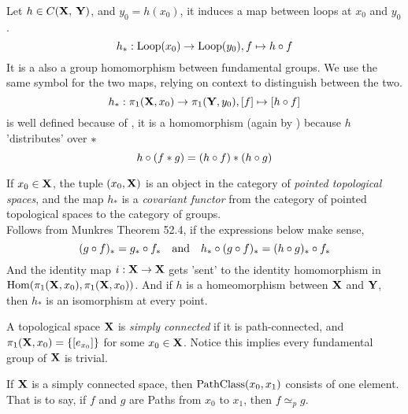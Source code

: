 \documentclass[../main-manifolds.tex]{subfiles}
\providecommand{\phtp}{\simeq_p} %
\providecommand{\fgroup}[2]{\pi_{1}({#1},{#2})}
\begin{document}
\begin{definition}\label{munkres:homomorphism-induced-by-continuous-map}
    Let $h\in C({\mathbf{X}},\: {\mathbf{Y}})$, and $y_0 = h(x_0)$, it induces a map between loops at $x_0$ and $y_0$. 
    \[
        h_*:\Loop[x_0]\to\Loop[y_0], f\mapsto h\circ f
    \]
    It is a also a group homomorphism between fundamental groups. We use the same symbol for the two maps, relying on context to distinguish between the two.
    \[
        h_*:\fgroup{\xx}{x_0}\to\fgroup{\yy}{y_0},[f]\mapsto [h\circ f]
    \]
    is well defined because of , it is a homomorphism (again by ) because $h$ 'distributes' over $\ast$
    \[
        h\circ (f\ast g)=(h\circ f)\ast (h\circ g)
    \]
\end{definition}
\begin{remark}
    If $x_0\in{\mathbf{X}}$, the tuple $(x_0, {\mathbf{X}})$ is an object in the category of \emph{pointed topological spaces}, and the map $h_*$ is a \emph{covariant functor} from the category of pointed topological spaces to the category of groups.\\

    Follows from Munkres Theorem 52.4, if the expressions below make sense,
    \[
        (g\circ f)_* = g_*\circ f_*\qqtext{and}  h_*\circ (g\circ f)_* = (h\circ g)_*\circ f_*
    \]
    And the identity map $i:{\mathbf{X}}\to{\mathbf{X}}$ gets 'sent' to the identity homomorphism in $\Hom[\fgroup{\xx}{x_0},\fgroup{\xx}{x_0}]$. And if $h$ is a homeomorphism between ${\mathbf{X}}$ and ${\mathbf{Y}}$, then $h_*$ is an isomorphism at every point.
\end{remark}


\begin{definition}\label{munkres:simply-connected}
    A topological space ${\mathbf{X}}$ is \emph{simply connected} if it is path-connected, and $\fgroup{\xx}{x_0}=\{[e_{x_0}]\}$ for some $x_0\in {\mathbf{X}}$. Notice this implies every fundamental group of ${\mathbf{X}}$ is trivial.
\end{definition}
\begin{wts}
    If ${\mathbf{X}}$ is a simply connected space, then $\PathClass[x_0,x_1]$ consists of one element. That is to say, if $f$ and $g$ are Paths from $x_0$ to $x_1$, then $f\phtp g$.
\end{wts}

\begin{definition}\label{munkres:covering-maps-spaces}
    
\end{definition}
\end{document}

